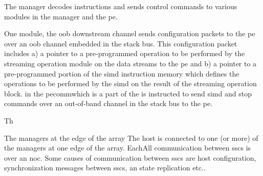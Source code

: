 The manager decodes instructions and sends control commands to various modules in the manager and the \ac{pe}.

One module, the \ac{oob} downstream channel sends configuration packets to the \ac{pe} over an \ac{oob} channel embedded in the stack bus.
This configuration packet includes a) a pointer to a pre-programmed operation to be performed by the streaming operation module on the data streams to the \ac{pe} and b) a pointer to a pre-programmed portion of the \ac{simd} instruction memory which defines the operations to be performed by the \ac{simd} on the result of the streaming operation block.
 in the \ac{pe}commwhich is a part of the is instructed to send \ac{simd} and \ac{stop} commands over an out-of-band channel in the stack bus to the \ac{pe}.

Th

The managers at the edge of the array The host is connected to one (or more) of the managers at one edge of the array. EachAll communication between \acp{ssc} is over an \ac{noc}. 
Some causes of communication between \acp{ssc} are host configuration, synchronization messages between \acp{ssc}, \ac{an} state replication etc..
\iffalse
Synchronization messages and \ac{an} state replication are a side effect of the instructions described in chapter \ref{sec:SystemOperations}.
\fi


